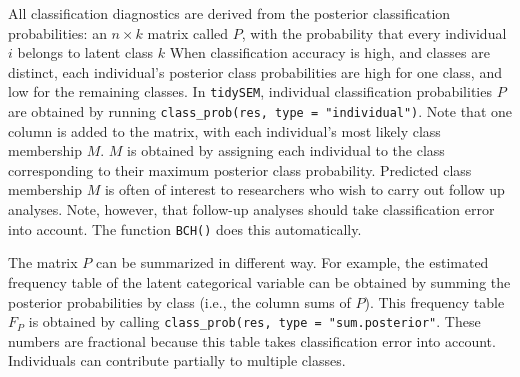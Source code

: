 \documentclass[
  ,man,floatsintext]{apa6}
\begin{document}
All classification diagnostics are derived from the posterior classification probabilities: an \(n \times k\) matrix called \(P\), with the probability that every individual \(i\) belongs to latent class \(k\)
When classification accuracy is high, and classes are distinct,
each individual's posterior class probabilities are high for one class, and low for the remaining classes.
In \texttt{tidySEM}, individual classification probabilities \(P\) are obtained by running \texttt{class\_prob(res,\ type\ =\ "individual")}.
Note that one column is added to the matrix, with each individual's most likely class membership \(M\).
\(M\) is obtained by assigning each individual to the class corresponding to their maximum posterior class probability.
Predicted class membership \(M\) is often of interest to researchers who wish to carry out follow up analyses.
Note, however, that follow-up analyses should take classification error into account.
The function \texttt{BCH()} does this automatically.

The matrix \(P\) can be summarized in different way.
For example, the estimated frequency table of the latent categorical variable can be obtained by summing the posterior probabilities by class (i.e., the column sums of \(P\)).
This frequency table \(F_P\) is obtained by calling \texttt{class\_prob(res,\ type\ =\ "sum.posterior"}.
These numbers are fractional because this table takes classification error into account.
Individuals can contribute partially to multiple classes.
\end{document}
